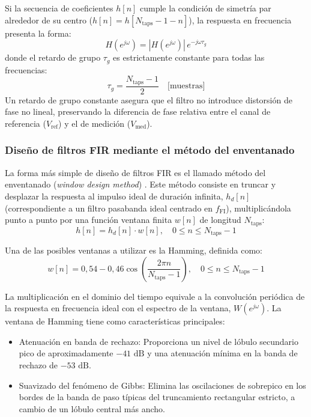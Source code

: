 Si la secuencia de coeficientes $h[n]$ cumple la condición de simetría par alrededor de su centro ($h[n] = h[N_{\text{taps}}-1-n]$), la respuesta en frecuencia presenta la forma:
\begin{equation}
    H(e^{j\omega}) = |H(e^{j\omega})| \, e^{-j \omega \tau_g}
\end{equation}
donde el retardo de grupo $\tau_g$ es estrictamente constante para todas las frecuencias:
\begin{equation}
    \tau_g = \frac{N_{\text{taps}} - 1}{2} \quad \text{[muestras]}
\end{equation}
Un retardo de grupo constante asegura que el filtro no introduce distorsión de fase no lineal, preservando la diferencia de fase relativa entre el canal de referencia ($V_{\text{ref}}$) y el de medición ($V_{\text{med}}$).

\subsubsection{Diseño de filtros FIR mediante el método del enventanado}

La forma más simple de diseño de filtros FIR es el llamado método del enventanado (\textit{window design method}) \cite{TDSoppenheim}. Este método consiste en truncar y desplazar la respuesta al impulso ideal de duración infinita, $h_d[n]$ (correspondiente a un filtro pasabanda ideal centrado en $f_{\text{FI}}$), multiplicándola punto a punto por una función ventana finita $w[n]$ de longitud $N_{\text{taps}}$:
\begin{equation}
    h[n] = h_d[n] \cdot w[n], \quad 0 \le n \le N_{\text{taps}}-1
\end{equation}

Una de las posibles ventanas a utilizar es la Hamming, definida  como:
\begin{equation}
    w[n] = 0{,}54 - 0{,}46 \cos\left( \frac{2\pi n}{N_{\text{taps}} - 1} \right), \quad 0 \le n \le N_{\text{taps}}-1
\end{equation}

La multiplicación en el dominio del tiempo equivale a la convolución periódica de la respuesta en frecuencia ideal con el espectro de la ventana, $W(e^{j\omega})$. La ventana de Hamming tiene como características principales:
\begin{itemize}
    \item Atenuación en banda de rechazo: Proporciona un nivel de lóbulo secundario pico de aproximadamente $-41\text{ dB}$ y una atenuación mínima en la banda de rechazo de $-53\text{ dB}$.
    \item Suavizado del fenómeno de Gibbs: Elimina las oscilaciones de sobrepico en los bordes de la banda de paso típicas del truncamiento rectangular estricto, a cambio de un lóbulo central más ancho.
\end{itemize}



